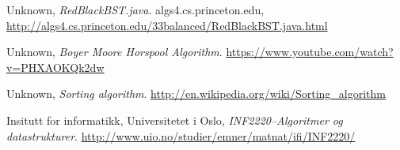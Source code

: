 \documentclass[11pt,a4paper]{article}
\theoremstyle{def}
\begin{document}
\newpage

\begin{thebibliography}{}

  Unknown,
  \emph{RedBlackBST.java}.
  algs4.cs.princeton.edu,
  \url{http://algs4.cs.princeton.edu/33balanced/RedBlackBST.java.html}

  Unknown,
  \emph{Boyer Moore Horspool Algorithm}.
  \url{https://www.youtube.com/watch?v=PHXAOKQk2dw}

  Unknown,
  \emph{Sorting algorithm}.
  \url{http://en.wikipedia.org/wiki/Sorting_algorithm}

 Insitutt for informatikk, Universitetet i Oslo,
  \emph{INF2220--Algoritmer og datastrukturer}.
  \url{http://www.uio.no/studier/emner/matnat/ifi/INF2220/}



\end{thebibliography}
\end{document}
